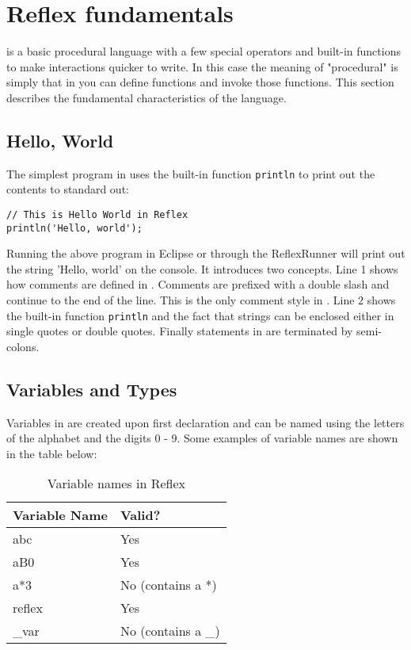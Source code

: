 \chapter{Reflex fundamentals}
\Reflex is a basic procedural language with a few special operators  and built-in functions  to make \Rapture interactions quicker to write. In this case the meaning of "procedural" is simply that in \Reflex you can define functions and invoke those functions. This section describes the fundamental characteristics of the language.
\section{Hello, World}
The simplest program in \Reflex uses the built-in function \Verb+println+  to print out the contents to standard out:
\begin{lstlisting}[caption={Hello world}]
// This is Hello World in Reflex
println('Hello, world');

\end{lstlisting}

Running the above program in Eclipse or through the ReflexRunner will print out the string 'Hello, world' on the console. It introduces two concepts. Line 1 shows how comments are defined in \Reflex. Comments are prefixed with a double slash and continue to the end of the line. This is the only comment style in \Reflex. Line 2 shows the built-in function \Verb+println+ and the fact that strings can be enclosed either in single quotes or double quotes. Finally statements in \Reflex are terminated by semi-colons.

\section{Variables and Types}

Variables  in \Reflex are created upon first declaration and can be named using the letters of the alphabet and the digits 0 - 9. Some examples of variable names are shown in the table below:

\begin{table}[h]
\small
\centering
\begin{tabular} { | l | l | }
Variable Name & Valid? \\
\hline
abc & Yes \\
aB0 & Yes \\
a*3 & No (contains a *) \\
reflex & Yes \\
\_var & No (contains a \_) \\
\end{tabular}
\caption{Variable names in Reflex}
\end{table}

